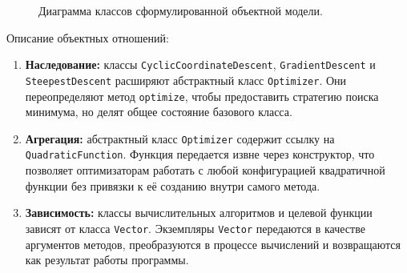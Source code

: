 \begin{figure}[H]
\caption{Диаграмма классов сформулированной объектной модели.}
\end{figure}

Описание объектных отношений:
\begin{enumerate}
    \item \textbf{Наследование:} классы \texttt{CyclicCoordinateDescent}, \texttt{GradientDescent} и \texttt{SteepestDescent} расширяют абстрактный класс \texttt{Optimizer}. Они переопределяют метод \texttt{optimize}, чтобы предоставить стратегию поиска минимума, но делят общее состояние базового класса.
    \item \textbf{Агрегация:} абстрактный класс \texttt{Optimizer} содержит ссылку на \texttt{Quadratic\allowbreak Function}. Функция передается извне через конструктор, что позволяет оптимизаторам работать с любой конфигурацией квадратичной функции без привязки к её созданию внутри самого метода.
    \item \textbf{Зависимость:} классы вычислительных алгоритмов и целевой функции зависят от класса \texttt{Vector}. Экземпляры \texttt{Vector} передаются в качестве аргументов методов, преобразуются в процессе вычислений и возвращаются как результат работы программы.
\end{enumerate}